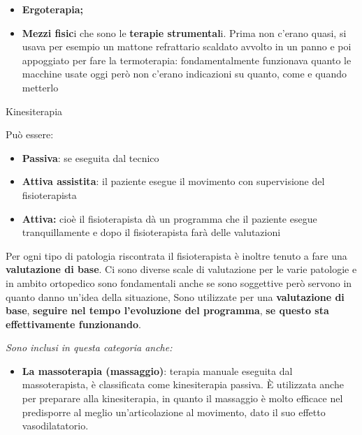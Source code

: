 \documentclass[]{article}
\begin{document}
\begin{itemize}
\item
  \textbf{Ergoterapia;}
\end{itemize}

\begin{itemize}
\item
  \textbf{Mezzi fisic}i che sono le \textbf{terapie strumental}i. Prima
  non c'erano quasi, si usava per esempio un mattone refrattario
  scaldato avvolto in un panno e poi appoggiato per fare la
  termoterapia: fondamentalmente funzionava quanto le macchine usate
  oggi però non c'erano indicazioni su quanto, come e quando metterlo
\end{itemize}

Kinesiterapia

Può essere:

\begin{itemize}
\item
  \textbf{Passiva}: se eseguita dal tecnico
\end{itemize}

\begin{itemize}
\item
  \textbf{Attiva assistita}: il paziente esegue il movimento con
  supervisione del fisioterapista
\end{itemize}

\begin{itemize}
\item
  \textbf{Attiva:} cioè il fisioterapista dà un programma che il
  paziente esegue tranquillamente e dopo il fisioterapista farà delle
  valutazioni
\end{itemize}

Per ogni tipo di patologia riscontrata il fisioterapista è inoltre
tenuto a fare una \textbf{valutazione di base}. Ci sono diverse scale di
valutazione per le varie patologie e in ambito ortopedico sono
fondamentali anche se sono soggettive però servono in quanto danno
un'idea della situazione, Sono utilizzate per una \textbf{valutazione di
base}, \textbf{seguire nel tempo l'evoluzione del programma}, \textbf{se
questo sta effettivamente funzionando}.

\emph{Sono inclusi in questa categoria anche:}

\begin{itemize}
\item
  \textbf{La massoterapia (massaggio)}: terapia manuale eseguita dal
  massoterapista, è classificata come kinesiterapia passiva. È
  utilizzata anche per preparare alla kinesiterapia, in quanto il
  massaggio è molto efficace nel predisporre al meglio un'articolazione
  al movimento, dato il suo effetto vasodilatatorio.
\end{itemize}
\end{document}
